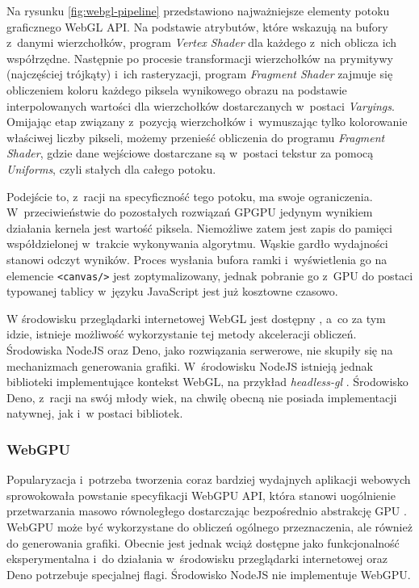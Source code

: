 Na rysunku \ref{fig:webgl-pipeline} przedstawiono najważniejsze elementy potoku graficznego WebGL API. Na podstawie atrybutów, które wskazują na bufory z~danymi wierzchołków, program \textit{Vertex Shader} dla każdego z~nich oblicza ich współrzędne. Następnie po procesie transformacji wierzchołków na prymitywy (najczęściej trójkąty) i~ich rasteryzacji, program \textit{Fragment Shader} zajmuje się obliczeniem koloru każdego piksela wynikowego obrazu na podstawie interpolowanych wartości dla wierzchołków dostarczanych w~postaci \textit{Varyings}. Omijając etap związany z~pozycją wierzchołków i~wymuszając tylko kolorowanie właściwej liczby pikseli, możemy przenieść obliczenia do programu \textit{Fragment Shader}, gdzie dane wejściowe dostarczane są w~postaci tekstur za pomocą \textit{Uniforms}, czyli stałych dla całego potoku.

Podejście to, z~racji na specyficzność tego potoku, ma swoje ograniczenia. W~przeciwieństwie do pozostałych rozwiązań GPGPU jedynym wynikiem działania kernela jest wartość piksela. Niemożliwe zatem jest zapis do pamięci współdzielonej w~trakcie wykonywania algorytmu. Wąskie gardło wydajności stanowi odczyt wyników. Proces wysłania bufora ramki i~wyświetlenia go na elemencie \lstinline{<canvas/>} jest zoptymalizowany, jednak pobranie go z~GPU do postaci typowanej tablicy w~języku JavaScript jest już kosztowne czasowo.

W środowisku przeglądarki internetowej WebGL jest dostępny , a~co za tym idzie, istnieje możliwość wykorzystanie tej metody akceleracji obliczeń. Środowiska NodeJS oraz Deno, jako rozwiązania serwerowe, nie skupiły się na mechanizmach generowania grafiki. W~środowisku NodeJS istnieją jednak biblioteki implementujące kontekst WebGL, na przykład \textit{headless-gl} \cite{headless-gl}. Środowisko Deno, z~racji na swój młody wiek, na chwilę obecną nie posiada implementacji natywnej, jak i~w postaci bibliotek. 

\subsubsection{WebGPU}

Popularyzacja i~potrzeba tworzenia coraz bardziej wydajnych aplikacji webowych sprowokowała powstanie specyfikacji WebGPU API, która stanowi uogólnienie przetwarzania masowo równoległego dostarczając bezpośrednio abstrakcję GPU \cite{webgpu_2022}. WebGPU może być wykorzystane do obliczeń ogólnego przeznaczenia, ale również do generowania grafiki. Obecnie jest jednak wciąż dostępne jako funkcjonalność eksperymentalna i~do działania w~środowisku przeglądarki internetowej oraz Deno potrzebuje specjalnej flagi. Środowisko NodeJS nie implementuje \mbox{WebGPU}.
